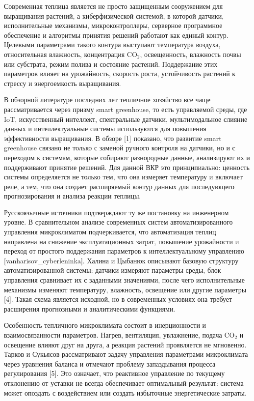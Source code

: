 \documentclass[a4paper,14pt]{extarticle}
\begin{document}
Современная теплица является не просто защищенным сооружением для
выращивания растений, а киберфизической системой, в которой датчики,
исполнительные механизмы, микроконтроллеры, серверное программное
обеспечение и алгоритмы принятия решений работают как единый контур.
Целевыми параметрами такого контура выступают температура воздуха,
относительная влажность, концентрация CO\(_2\), освещенность, влажность
почвы или субстрата, режим полива и состояние растений. Поддержание этих
параметров влияет на урожайность, скорость роста, устойчивость растений
к стрессу и энергоемкость выращивания.

В обзорной литературе последних лет тепличное хозяйство все чаще
рассматривается через призму smart greenhouse, то есть управляемой
среды, где IoT, искусственный интеллект, спектральные датчики,
мультимодальное слияние данных и интеллектуальные системы используются
для повышения эффективности выращивания. В обзоре {[}1{]} показано, что
развитие smart greenhouse связано не только с заменой ручного контроля
на датчики, но и с переходом к системам, которые собирают разнородные
данные, анализируют их и поддерживают принятие решений. Для данной ВКР
это принципиально: ценность системы определяется не только тем, что она
измеряет температуру и включает реле, а тем, что она создает расширяемый
контур данных для последующего прогнозирования и анализа реакции
теплицы.

Русскоязычные источники подтверждают ту же постановку на инженерном
уровне. В сравнительном анализе современных систем автоматизированного
управления микроклиматом подчеркивается, что автоматизация теплиц
направлена на снижение эксплуатационных затрат, повышение урожайности и
переход от простого поддержания параметров к интеллектуальному
управлению {[}vanharisov\_cyberleninka{]}. Халина и Цыбанюк описывают
базовую структуру автоматизированной системы: датчики измеряют параметры
среды, блок управления сравнивает их с заданными значениями, после чего
исполнительные механизмы изменяют температуру, влажность, освещение или
другие параметры {[}4{]}. Такая схема является исходной, но в
современных условиях она требует расширения прогнозными и аналитическими
функциями.

Особенность тепличного микроклимата состоит в инерционности и
взаимосвязанности параметров. Нагрев, вентиляция, увлажнение, подача
CO\(_2\) и освещение влияют друг на друга, а реакция растений
проявляется не мгновенно. Тарков и Сукьясов рассматривают задачу
управления параметрами микроклимата через уравнения баланса и отмечают
проблему запаздывания процесса регулирования {[}5{]}. Это означает, что
реактивное управление по текущему отклонению от уставки не всегда
обеспечивает оптимальный результат: система может опоздать с
воздействием или создать избыточные энергетические затраты.
\end{document}
